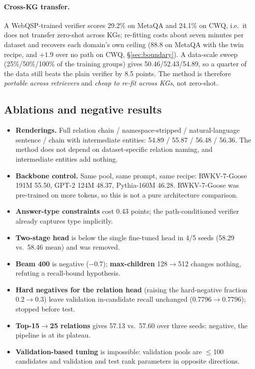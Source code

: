 \documentclass[sigconf,review,anonymous]{acmart}
\begin{document}
\paragraph{Cross-KG transfer.}
A WebQSP-trained verifier scores 29.2\% on MetaQA and 24.1\% on CWQ, i.e.\ it does not transfer zero-shot across KGs; re-fitting costs about seven minutes per dataset and recovers each domain's own ceiling (88.8 on MetaQA with the twin recipe, and $+1.9$ over no path on CWQ, \S\ref{sec:boundary}). A data-scale sweep (25\%/50\%/100\% of the training groups) gives 50.46/52.43/54.89, so a quarter of the data still beats the plain verifier by 8.5 points. The method is therefore \emph{portable across retrievers} and \emph{cheap to re-fit across KGs}, not zero-shot.

\subsection{Ablations and negative results}
\label{sec:neg}

\begin{itemize}
\item \textbf{Renderings.} Full relation chain / namespace-stripped / natural-language sentence / chain with intermediate entities: 54.89 / 55.87 / 56.48 / 56.36. The method does not depend on dataset-specific relation naming, and intermediate entities add nothing.
\item \textbf{Backbone control.} Same pool, same prompt, same recipe: RWKV-7-Goose 191M 55.50, GPT-2 124M 48.37, Pythia-160M 46.28. RWKV-7-Goose was pre-trained on more tokens, so this is not a pure architecture comparison.
\item \textbf{Answer-type constraints} cost 0.43 points; the path-conditioned verifier already captures type implicitly.
\item \textbf{Two-stage head} is below the single fine-tuned head in 4/5 seeds (58.29 vs.\ 58.46 mean) and was removed.
\item \textbf{Beam 400} is negative ($-0.7$); \textbf{max-children} 128$\to$512 changes nothing, refuting a recall-bound hypothesis.
\item \textbf{Hard negatives for the relation head} (raising the hard-negative fraction 0.2$\to$0.3) leave validation in-candidate recall unchanged (0.7796$\to$0.7796); stopped before test.
\item \textbf{Top-15$\to$25 relations} gives 57.13 vs.\ 57.60 over three seeds: negative, the pipeline is at its plateau.
\item \textbf{Validation-based tuning} is impossible: validation pools are $\le$100 candidates and validation and test rank parameters in opposite directions.
\end{itemize}
\end{document}
